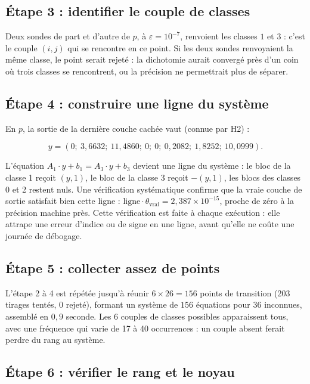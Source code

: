 \documentclass[11pt]{article}
\begin{document}
\subsection*{Étape 3 : identifier le couple de classes}

Deux sondes de part et d'autre de $p$, à $\varepsilon = 10^{-7}$, renvoient
les classes $1$ et $3$ : c'est le couple $(i,j)$ qui se rencontre en ce
point. Si les deux sondes renvoyaient la même classe, le point serait
rejeté : la dichotomie aurait convergé près d'un coin où trois classes se
rencontrent, ou la précision ne permettrait plus de séparer.

\subsection*{Étape 4 : construire une ligne du système}

En $p$, la sortie de la dernière couche cachée vaut (connue par H2) :

\[
y = (0 ;\ 3{,}6632 ;\ 11{,}4860 ;\ 0 ;\ 0 ;\ 0{,}2082 ;\ 1{,}8252 ;\ 10{,}0999).
\]

L'équation $A_1 \cdot y + b_1 = A_3 \cdot y + b_3$ devient une ligne du
système : le bloc de la classe 1 reçoit $(y, 1)$, le bloc de la classe 3
reçoit $-(y,1)$, les blocs des classes 0 et 2 restent nuls. Une vérification
systématique confirme que la vraie couche de sortie satisfait bien cette
ligne : $\text{ligne} \cdot \theta_{\text{vrai}} = 2{,}387 \times 10^{-15}$,
proche de zéro à la précision machine près. Cette vérification est faite à
chaque exécution : elle attrape une erreur d'indice ou de signe en une
ligne, avant qu'elle ne coûte une journée de débogage.

\subsection*{Étape 5 : collecter assez de points}

L'étape 2 à 4 est répétée jusqu'à réunir $6 \times 26 = 156$ points de
transition (203 tirages tentés, 0 rejeté), formant un système de $156$
équations pour $36$ inconnues, assemblé en $0{,}9$ seconde. Les 6 couples de
classes possibles apparaissent tous, avec une fréquence qui varie de 17 à 40
occurrences : un couple absent ferait perdre du rang au système.

\subsection*{Étape 6 : vérifier le rang et le noyau}
\end{document}
